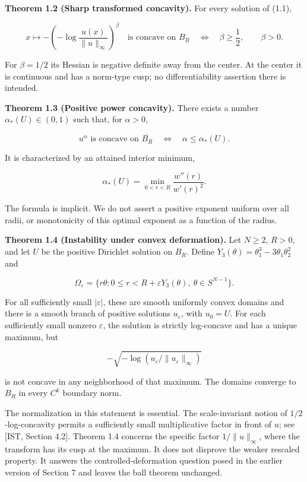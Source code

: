 \documentclass[11pt]{article}
\begin{document}
\textbf{Theorem 1.2 (Sharp transformed concavity).} For every solution
of (1.1),

\[
x\longmapsto -\left(-\log\frac{u(x)}{\|u\|_\infty}\right)^\beta
\quad\text{is concave on }B_R
\quad\Longleftrightarrow\quad \beta\geq\frac12,
\qquad \beta>0.
\tag{1.6}
\]

For \(\beta=1/2\) its Hessian is negative definite away from the center.
At the center it is continuous and has a norm-type cusp; no
differentiability assertion there is intended.

\textbf{Theorem 1.3 (Positive power concavity).} There exists a number
\(\alpha_*(U)\in(0,1)\) such that, for \(\alpha>0\),

\[
u^\alpha\text{ is concave on }\overline{B_R}
\quad\Longleftrightarrow\quad
\alpha\leq\alpha_*(U).
\tag{1.7}
\]

It is characterized by an attained interior minimum,

\[
\alpha_*(U)=\min_{0<r<R}\frac{w''(r)}{w'(r)^2}.
\tag{1.8}
\]

The formula is implicit. We do not assert a positive exponent uniform
over all radii, or monotonicity of this optimal exponent as a function
of the radius.

\textbf{Theorem 1.4 (Instability under convex deformation).} Let
\(N\geq2\), \(R>0\), and let \(U\) be the positive Dirichlet solution on
\(B_R\). Define \(Y_3(\theta)=\theta_1^3-3\theta_1\theta_2^2\) and

\[\Omega_\varepsilon=\{r\theta:0\leq r<R+\varepsilon Y_3(\theta),\ \theta\in S^{N-1}\}.\]

For all sufficiently small \(|\varepsilon|\), these are smooth uniformly
convex domains and there is a smooth branch of positive solutions
\(u_\varepsilon\), with \(u_0=U\). For each sufficiently small nonzero
\(\varepsilon\), the solution is strictly log-concave and has a unique
maximum, but

\[-\sqrt{-\log(u_\varepsilon/\|u_\varepsilon\|_\infty)}\]

is not concave in any neighborhood of that maximum. The domains converge
to \(B_R\) in every \(C^k\) boundary norm.

The normalization in this statement is essential. The scale-invariant
notion of \(1/2\)-log-concavity permits a sufficiently small
multiplicative factor in front of \(u\); see {[}IST, Section 4.2{]}.
Theorem 1.4 concerns the specific factor \(1/\|u\|_\infty\), where the
transform has its cusp at the maximum. It does not disprove the weaker
rescaled property. It answers the controlled-deformation question posed
in the earlier version of Section 7 and leaves the ball theorem
unchanged.
\end{document}

